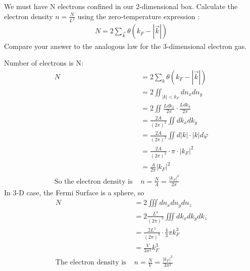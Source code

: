 \documentclass[answers]{exam}
\begin{document}
\begin{questions}
\question We must have N electrons confined in our 2-dimensional box. Calculate the electron density $n = \frac{N}{L^{2}}$ using the zero-temperature expression :
\begin{align*}
N=2 \sum_{\vec{k}} \theta\left(k_{F}-|\vec{k}|\right)
\end{align*}
Compare your answer to the analogous law for the 3-dimensional electron gas.
\begin{solution}
Number of electrons is N:
\begin{align*}
N &=2 \sum_{k} \theta\left(k_{F}-|\vec{k}|\right)  \\
&=2 \iint_{|k|<k_{F}} d n_{x}  d n_{y} \\
&=2 \iint \frac{L d k_{x}}{2 \pi} \cdot \frac{L d k_{ y}}{2 \pi} \\
&=\frac{2 A}{(2 \pi)^{2}} \iint d k _{x} d k_{y}  \\
&=\frac{2 A}{(2 \pi)^{2}} \iint d|k|\cdot| k |d \varphi\\
&=\frac{2 A}{(2 \pi)^{2}} \cdot \pi\cdot \left|k_{F}\right|^{2} \\
&=\frac{A}{2 \pi}|k_{F}|^{2}\\
\text{So the electron density is }& n =\frac{N}{A}=\frac{|k_{F}|^2}{2\pi}
\end{align*}
In 3-D case, the Fermi Surface is a sphere, so 
\begin{align*}
N&=2 \iiint d n_{x} d n_{y} dn_{z} \\
&=2  \frac{L^{3}}{(2 \pi)^{3}} \iiint d k_{x} d k_{y} d k_{z} \\
&=\frac{2  L^{3}}{(2 \pi)^{3}} \cdot \frac{4}{3} \pi k_{F}^{3} \\
&=\frac{V}{3 \pi^{2}} k_{F}^{3}\\
\text{The electron density is }& n =\frac{N}{V}=\frac{|k_{F}|^3}{3{\pi}^2}
\end{align*}
\end{solution}
\end{questions}
\end{document}
